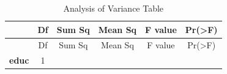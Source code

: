 \documentclass[]{article}
\begin{document}
\begin{longtable}[]{@{}cccccc@{}}
\caption{Analysis of Variance Table}\tabularnewline
\toprule
\begin{minipage}[b]{0.19\columnwidth}\centering\strut
~\strut
\end{minipage} & \begin{minipage}[b]{0.07\columnwidth}\centering\strut
Df\strut
\end{minipage} & \begin{minipage}[b]{0.10\columnwidth}\centering\strut
Sum Sq\strut
\end{minipage} & \begin{minipage}[b]{0.12\columnwidth}\centering\strut
Mean Sq\strut
\end{minipage} & \begin{minipage}[b]{0.12\columnwidth}\centering\strut
F value\strut
\end{minipage} & \begin{minipage}[b]{0.13\columnwidth}\centering\strut
Pr(\textgreater{}F)\strut
\end{minipage}\tabularnewline
\midrule
\endfirsthead
\toprule
\begin{minipage}[b]{0.19\columnwidth}\centering\strut
~\strut
\end{minipage} & \begin{minipage}[b]{0.07\columnwidth}\centering\strut
Df\strut
\end{minipage} & \begin{minipage}[b]{0.10\columnwidth}\centering\strut
Sum Sq\strut
\end{minipage} & \begin{minipage}[b]{0.12\columnwidth}\centering\strut
Mean Sq\strut
\end{minipage} & \begin{minipage}[b]{0.12\columnwidth}\centering\strut
F value\strut
\end{minipage} & \begin{minipage}[b]{0.13\columnwidth}\centering\strut
Pr(\textgreater{}F)\strut
\end{minipage}\tabularnewline
\midrule
\endhead
\begin{minipage}[t]{0.19\columnwidth}\centering\strut
\textbf{educ}\strut
\end{minipage} & \begin{minipage}[t]{0.07\columnwidth}\centering\strut
1\strut
\end{minipage} & \begin{minipage}[t]{0.10\columnwidth}\centering\strut

\end{minipage}
\end{longtable}
\end{document}

